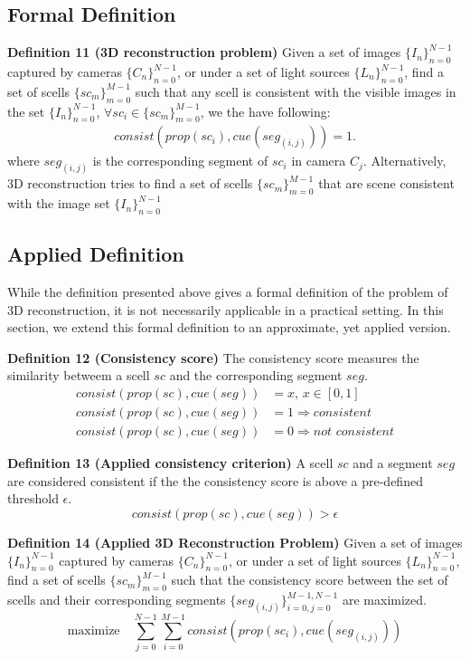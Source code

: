 \subsection{Formal Definition}
\noindent\textbf{Definition 11 (3D reconstruction problem)} Given a set of images $\{I_n\}_{n=0}^{N-1}$ captured by cameras $\{C_n\}_{n=0}^{N-1}$, or under a set of light sources $\{L_n\}_{n=0}^{N-1}$, find a set of scells $\{sc_m\}_{m=0}^{M-1}$ such that any scell is consistent with the visible images in the set $\{I_n\}_{n=0}^{N-1}$, \ie $\forall sc_i\in \{sc_m\}_{m=0}^{M-1}$, we the have following:
\begin{align*}
consist(prop(sc_i), cue(seg_{(i, j)})) = 1.
\end{align*}
where $seg_{(i, j)}$ is the corresponding segment of $sc_i$ in camera $C_j$. Alternatively, 3D reconstruction tries to find a set of scells $\{sc_m\}_{m=0}^{M-1}$ that are scene consistent with the image set $\{I_n\}_{n=0}^{N-1}$

\subsection{Applied Definition}
While the definition presented above gives a formal definition of the problem of 3D reconstruction, it is not necessarily applicable in a practical setting. In this section, we extend this formal definition to an approximate, yet applied version.

\noindent\textbf{Definition 12 (Consistency score)} The consistency score measures the similarity betweem a scell $sc$ and the corresponding segment $seg$.
\begin{align*}
consist(prop(sc), cue(seg)) &= x \text{, } x\in[0, 1]\\
consist(prop(sc), cue(seg)) &= 1 \Rightarrow \textit{consistent}\\
consist(prop(sc), cue(seg)) &= 0 \Rightarrow \textit{not consistent}
\end{align*}

\noindent\textbf{Definition 13 (Applied consistency criterion)} A scell $sc$ and a segment $seg$ are considered consistent if the the consistency score is above a pre-defined threshold $\epsilon$.
$$
consist(prop(sc), cue(seg)) > \epsilon
$$


\noindent\textbf{Definition 14 (Applied 3D Reconstruction Problem)} Given a set of images $\{I_n\}_{n=0}^{N-1}$ captured by cameras $\{C_n\}_{n=0}^{N-1}$, or under a set of light sources $\{L_n\}_{n=0}^{N-1}$, find a set of scells $\{sc_m\}_{m=0}^{M-1}$ such that the consistency score between the set of scells and their corresponding segments $\{seg_{(i, j)}\}_{i=0,j=0}^{M-1,N-1}$ are maximized.
$$
\mbox{maximize} \quad \sum_{j=0}^{N-1}\sum_{i=0}^{M-1} consist(prop(sc_i), cue(seg_{(i, j)}))
$$

